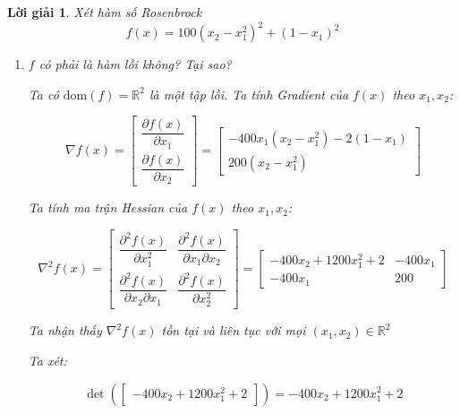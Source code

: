 \documentclass[14pt, a4paper]{article}
\theoremstyle{sltheorem}
\theoremstyle{soltheorem}
\newtheorem*{loigiai}{Lời giải}
\begin{document}
    \begin{loigiai}
        Xét hàm số Rosenbrock
        \begin{equation*}
            f(x)=100(x_2 - x_1^2)^2 + (1-x_1)^2
        \end{equation*}
        \begin{enumerate} [wide, labelwidth=!, labelindent=0pt,label=\textbf{\arabic*}.]
            \item $f$ có phải là hàm lồi không? Tại sao?

            Ta có $\mathrm{dom}(f)=\mathbb{R}^{2}$ là một tập lồi. Ta tính Gradient của $f(x)$ theo $x_1, x_2$:

            \begin{equation*}
                \nabla f(x) = \begin{bmatrix} \dfrac{\partial f(x)}{\partial x_1} \\ \dfrac{\partial f(x)}{\partial x_2}\end{bmatrix} = \begin{bmatrix} -400x_1(x_2 - x_1^2) -2(1-x_1) \\ 200(x_2 - x_1^2) \end{bmatrix}
            \end{equation*}

            Ta tính ma trận Hessian của $f(x)$ theo $x_1, x_2$:

            \begin{equation*}
                \nabla^2 f(x)=\begin{bmatrix} \dfrac{\partial^2 f(x)}{\partial x_1^2} & \dfrac{\partial^2 f(x)}{\partial x_1\partial x_2} \\ \dfrac{\partial^2 f(x)}{\partial x_2 \partial x_1 } & \dfrac{\partial^2 f(x)}{\partial x_2^2 } \end{bmatrix} = \begin{bmatrix} -400 x_2 + 1200x_1^2 + 2 & -400 x_1 \\ -400x_1 & 200 \end{bmatrix}
            \end{equation*}

            Ta nhận thấy $\nabla^2 f(x)$ tồn tại và liên tục với mọi $(x_1, x_2) \in \mathbb{R}^{2}$

            Ta xét:

            \begin{equation*}
                \det (\begin{bmatrix} -400 x_2 + 1200x_1^2 + 2 \end{bmatrix})=-400 x_2 + 1200x_1^2 + 2
            \end{equation*}


\end{enumerate}
\end{loigiai}
\end{document}
